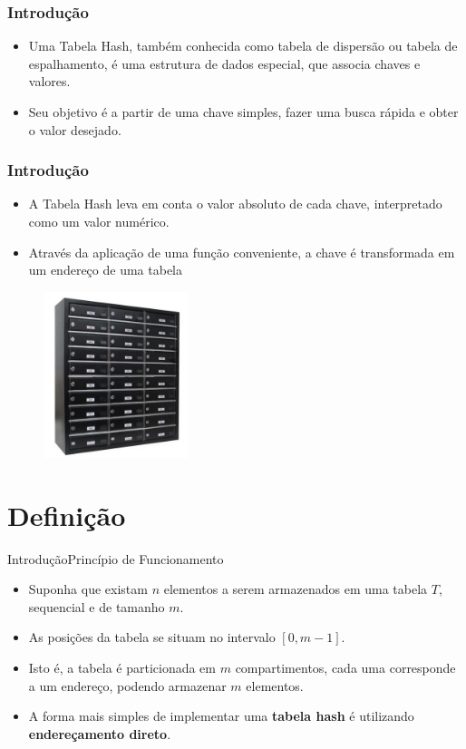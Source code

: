\documentclass[aspectratio=169]{beamer}
\begin{document}
\begin{frame}
\frametitle{Introdução}
\begin{itemize}
 \item Uma Tabela Hash, também conhecida como tabela de dispersão ou tabela de espalhamento, é uma estrutura de dados especial, que associa chaves e valores. 
 \item Seu objetivo é a partir de uma chave simples, fazer uma busca rápida e obter o valor desejado. 
\end{itemize}
\end{frame}

\begin{frame}
\frametitle{Introdução}
\begin{itemize}
 \item A Tabela Hash leva em conta o valor absoluto de cada chave, interpretado como um valor numérico. 
 \item Através da aplicação de uma função conveniente, a chave é transformada em um endereço de uma tabela 
\end{itemize}
\begin{figure}[!h]
  \centering
  \includegraphics[width=120pt]{imagens/correspondencia.png}
  \label{fig_escaninho}
\end{figure}
\end{frame}

\section{Definição}

\begin{frame}{Introdução}{Princípio de Funcionamento}
\begin{itemize}
 \item Suponha que existam $n$ elementos a serem armazenados em uma tabela $T$, sequencial e de tamanho $m$. 
 \item As posições da tabela se situam no intervalo $[0, m-1]$. 
 \item Isto é, a tabela é particionada em $m$ compartimentos, cada uma corresponde a um endereço, podendo armazenar $m$ elementos.
 \item A forma mais simples de implementar uma {\bf tabela hash} é utilizando {\bf endereçamento direto}.
\end{itemize}
\end{frame}
\end{document}
